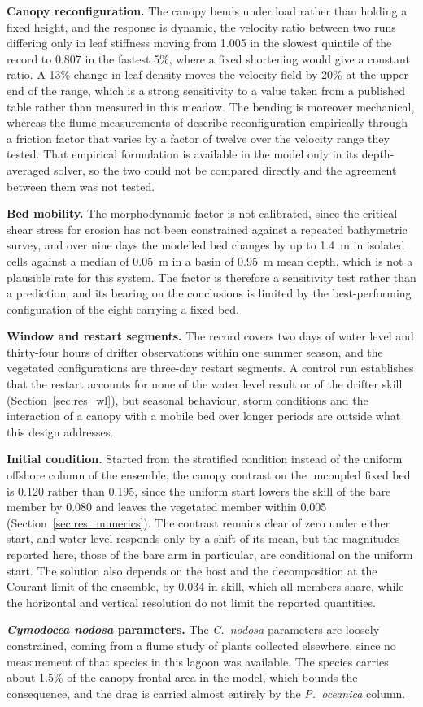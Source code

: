\textbf{Canopy reconfiguration.} The canopy bends under load rather than holding
a fixed height, and the response is dynamic, the velocity ratio between two runs
differing only in leaf stiffness moving from 1.005 in the slowest quintile of
the record to 0.807 in the fastest 5\%, where a fixed shortening would give a
constant ratio. A 13\% change in leaf density moves the velocity field by 20\%
at the upper end of the range, which is a strong sensitivity to a value taken
from a published table rather than measured in this meadow. The bending is
moreover mechanical, whereas the flume measurements of \citet{CiraoloFerreri2006} describe
reconfiguration empirically through a friction factor that varies by a factor of
twelve over the velocity range they tested. That empirical formulation is
available in the model only in its depth-averaged solver, so the two could not
be compared directly and the agreement between them was not tested.

\textbf{Bed mobility.} The morphodynamic factor is not calibrated, since the
critical shear stress for erosion has not been constrained against a repeated
bathymetric survey, and over nine days the modelled bed changes by up to 1.4~m
in isolated cells against a median of 0.05~m in a basin of 0.95~m mean depth,
which is not a plausible rate for this system. The factor is therefore a
sensitivity test rather than a prediction, and its bearing on the conclusions is
limited by the best-performing configuration of the eight carrying a fixed
bed.

\textbf{Window and restart segments.} The record covers two days of water level
and thirty-four hours of drifter observations within one summer season, and the
vegetated configurations are three-day restart segments. A control run
establishes that the restart accounts for none of the water level result or of
the drifter skill (Section~\ref{sec:res_wl}), but seasonal
behaviour, storm conditions and the interaction of a canopy with a mobile bed
over longer periods are outside what this design addresses.

\textbf{Initial condition.} Started from the stratified condition instead of the
uniform offshore column of the ensemble, the canopy contrast on the uncoupled
fixed bed is 0.120 rather than 0.195, since the uniform start lowers the skill of the bare member
by 0.080 and leaves the vegetated member within 0.005
(Section~\ref{sec:res_numerics}). The contrast remains clear of zero under
either start, and water level responds only by a shift of its mean, but the
magnitudes reported here, those of the bare arm in particular, are conditional
on the uniform start. The solution also depends on the host and the
decomposition at the Courant limit of the ensemble, by 0.034 in skill, which all
members share, while the horizontal and vertical resolution do not limit the
reported quantities.

\textbf{\emph{Cymodocea nodosa} parameters.} The \emph{C.\ nodosa} parameters
are loosely constrained, coming from a flume study of plants collected
elsewhere, since no measurement of that species in this lagoon was available.
The species carries about 1.5\% of the canopy frontal area in the model, which
bounds the consequence, and the drag is carried almost entirely by the
\emph{P.\ oceanica} column.
